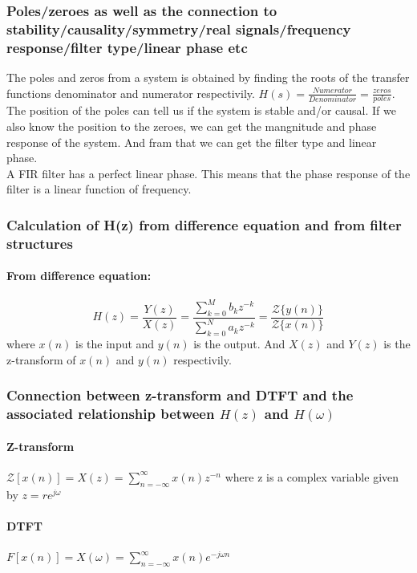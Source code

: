 \documentclass{article}
\begin{document}
\subsubsection{Poles/zeroes as well as the connection to stability/causality/symmetry/real signals/frequency response/filter type/linear phase etc}
The poles and zeros from a system is obtained by finding the roots of the transfer functions denominator and numerator respectivily.  $H(s) = \frac{Numerator}{Denominator} = \frac{zeros}{poles}$. The position of the poles can tell us if the system is stable and/or causal. If we also know the position to the zeroes, we can get the mangnitude and phase response of the system. And fram that we can get the filter type and linear phase.
\\
A FIR filter has a perfect linear phase. This means that the phase response of the filter is a linear function of frequency.

\subsubsection{Calculation of H(z) from difference equation and from filter structures}
\paragraph{From difference equation:} 
\begin{equation}
    H(z) = \frac{Y(z)}{X(z)} = \frac{\sum_{k=0}^{M}b_kz^{-k}}{\sum_{k=0}^{N}a_kz^{-k} }= \frac{\mathcal{Z}\{y(n)\}}{\mathcal{Z}\{x(n)\}}
\end{equation}
where $x(n)$ is the input and $y(n)$ is the output. And $X(z)$ and $Y(z)$ is the z-transform of $x(n)$ and $y(n)$ respectivily. 

\subsubsection{Connection between z-transform and DTFT and the associated relationship between $H(z)$ and $H(\omega)$}

\paragraph{Z-transform} $\mathcal{Z}[x(n)] = X(z) = \sum_{n=-\infty}^{\infty}x(n)z^{-n}$ where z is a complex variable given by $z = re^{j\omega}$
\paragraph{DTFT} $F[x(n)] = X(\omega) = \sum_{n=-\infty}^{\infty}x(n)e^{-j\omega n}$
\end{document}
